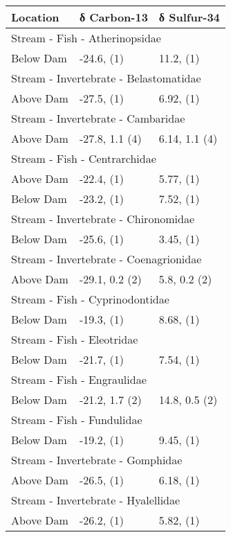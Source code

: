 \documentclass[
]{article}
\begin{document}
\begin{longtable}{lll}
\toprule
Location & δ Carbon-13 & δ Sulfur-34 \\ 
\midrule
\multicolumn{3}{l}{Stream - Fish - Atherinopsidae} \\ 
\midrule
Below Dam & -24.6,     (1) & 11.2,     (1) \\ 
\midrule
\multicolumn{3}{l}{Stream - Invertebrate - Belastomatidae} \\ 
\midrule
Above Dam & -27.5,     (1) & 6.92,     (1) \\ 
\midrule
\multicolumn{3}{l}{Stream - Invertebrate - Cambaridae} \\ 
\midrule
Above Dam & -27.8, 1.1 (4) & 6.14, 1.1 (4) \\ 
\midrule
\multicolumn{3}{l}{Stream - Fish - Centrarchidae} \\ 
\midrule
Above Dam & -22.4,     (1) & 5.77,     (1) \\ 
Below Dam & -23.2,     (1) & 7.52,     (1) \\ 
\midrule
\multicolumn{3}{l}{Stream - Invertebrate - Chironomidae} \\ 
\midrule
Below Dam & -25.6,     (1) & 3.45,     (1) \\ 
\midrule
\multicolumn{3}{l}{Stream - Invertebrate - Coenagrionidae} \\ 
\midrule
Above Dam & -29.1, 0.2 (2) & 5.8, 0.2 (2) \\ 
\midrule
\multicolumn{3}{l}{Stream - Fish - Cyprinodontidae} \\ 
\midrule
Below Dam & -19.3,     (1) & 8.68,     (1) \\ 
\midrule
\multicolumn{3}{l}{Stream - Fish - Eleotridae} \\ 
\midrule
Below Dam & -21.7,     (1) & 7.54,     (1) \\ 
\midrule
\multicolumn{3}{l}{Stream - Fish - Engraulidae} \\ 
\midrule
Below Dam & -21.2, 1.7 (2) & 14.8, 0.5 (2) \\ 
\midrule
\multicolumn{3}{l}{Stream - Fish - Fundulidae} \\ 
\midrule
Below Dam & -19.2,     (1) & 9.45,     (1) \\ 
\midrule
\multicolumn{3}{l}{Stream - Invertebrate - Gomphidae} \\ 
\midrule
Above Dam & -26.5,     (1) & 6.18,     (1) \\ 
\midrule
\multicolumn{3}{l}{Stream - Invertebrate - Hyalellidae} \\ 
\midrule
Above Dam & -26.2,     (1) & 5.82,     (1) \\ 

\end{longtable}
\end{document}

